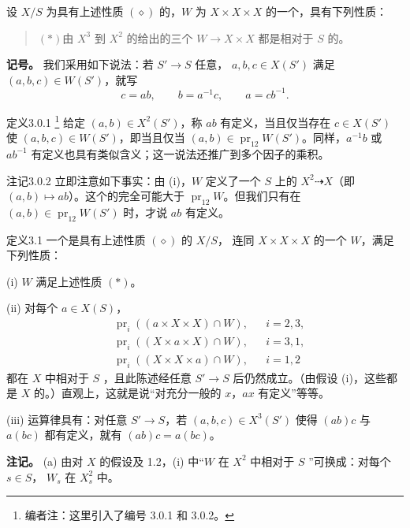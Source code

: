 设 $X/S$ 为具有上述性质 $(\diamond)$ 的，$W$ 为 $X\times X\times X$ 的一个，具有下列性质：
\begin{quote}
$(*)$\quad 由 $X^3$ 到 $X^2$ 的给出的三个 $W\to X\times X$ 都是相对于 $S$ 的。
\end{quote}
\textbf{记号。} 我们采用如下说法：若 $S'\to S$ 任意， $a,b,c\in X(S')$ 满足 $(a,b,c)\in W(S')$，就写
\[
c=ab,\qquad b=a^{-1}c,\qquad a=cb^{-1}.
\]
\begin{SGAresult}{定义}{3.0.1}
\footnote{编者注：这里引入了编号 3.0.1 和 3.0.2。} 给定 $(a,b)\in X^2(S')$，称 $ab$ 有定义，当且仅当存在 $c\in X(S')$ 使 $(a,b,c)\in W(S')$，即当且仅当 $(a,b)\in\operatorname{pr}_{12}W(S')$。同样，$a^{-1}b$ 或 $ab^{-1}$ 有定义也具有类似含义；这一说法还推广到多个因子的乘积。
\end{SGAresult}
\begin{SGAresult}{注记}{3.0.2}
立即注意如下事实：由 (i)，$W$ 定义了一个 $S$ 上的 $X^2\dashrightarrow X$（即 $(a,b)\mapsto ab$）。这个的完全可能大于 $\operatorname{pr}_{12}W$。但我们只有在 $(a,b)\in\operatorname{pr}_{12}W(S')$ 时，才说 $ab$ 有定义。
\end{SGAresult}
\begin{SGAresult}{定义}{3.1}
一个是具有上述性质 $(\diamond)$ 的 $X/S$，
连同 $X\times X\times X$ 的一个 $W$，满足下列性质：

(i) $W$ 满足上述性质 $(*)$。

(ii) 对每个 $a\in X(S)$，
\[
\begin{aligned}
{}&\operatorname{pr}_i((a\times X\times X)\cap W),&&i=2,3,\\
&\operatorname{pr}_i((X\times a\times X)\cap W),&&i=3,1,\\
&\operatorname{pr}_i((X\times X\times a)\cap W),&&i=1,2
\end{aligned}
\]
都在 $X$ 中相对于 $S$ ，且此陈述经任意 $S'\to S$ 后仍然成立。（由假设 (i)，这些都是 $X$ 的。）直观上，这就是说“对充分一般的 $x$，$ax$ 有定义”等等。

(iii) 运算律具有：对任意 $S'\to S$，若 $(a,b,c)\in X^3(S')$ 使得 $(ab)c$ 与 $a(bc)$ 都有定义，就有 $(ab)c=a(bc)$。
\end{SGAresult}
\textbf{注记。} (a) 由对 $X$ 的假设及 1.2，(i) 中“$W$ 在 $X^2$ 中相对于 $S$ ”可换成：对每个 $s\in S$， $W_s$ 在 $X_s^2$ 中。

